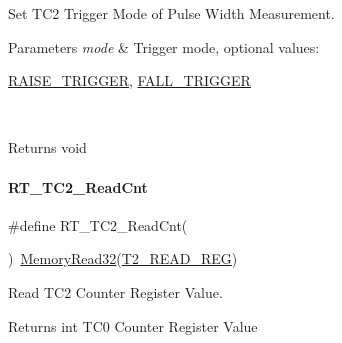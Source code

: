 Set T\+C2 Trigger Mode of Pulse Width Measurement. 


\begin{DoxyParams}{Parameters}
{\em mode} & Trigger mode, optional values\+:
\begin{DoxyCode}
\mbox{\hyperlink{a00026_abda90eda34a640b130f48a6ade23fe22}{RAISE\_TRIGGER}}, \mbox{\hyperlink{a00026_a9bbaf5b9e2125c7597249c7113b20e6c}{FALL\_TRIGGER}}
\end{DoxyCode}
 \\
\hline
\end{DoxyParams}
\begin{DoxyReturn}{Returns}
void 
\end{DoxyReturn}
\mbox{\label{a00083_a6591a513f367f6e7be0a90cb72aa3d49}} 
\paragraph{\texorpdfstring{R\+T\+\_\+\+T\+C2\+\_\+\+Read\+Cnt}{RT\_TC2\_ReadCnt}}
{\footnotesize\ttfamily \#define R\+T\+\_\+\+T\+C2\+\_\+\+Read\+Cnt(\begin{DoxyParamCaption}{ }\end{DoxyParamCaption})~\mbox{\hyperlink{a00026_a2d484dc15bdf30ee11ab3b05f31f0e16}{Memory\+Read32}}(\mbox{\hyperlink{a00026_ac9b4238c1829d1e3414db560a290e861}{T2\+\_\+\+R\+E\+A\+D\+\_\+\+R\+EG}})}



Read T\+C2 Counter Register Value. 

\begin{DoxyReturn}{Returns}
int T\+C0 Counter Register Value 
\end{DoxyReturn}
\mbox{\label{a00083_a49e7120e90142442bdd0744f61b572a5}} 
